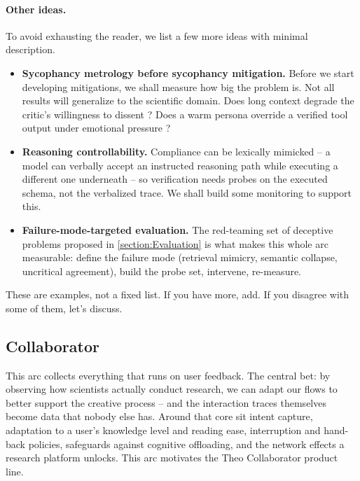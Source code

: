 \paragraph{Other ideas.}
To avoid exhausting the reader, we list a few more ideas with minimal description.
\begin{itemize}
    \item \textbf{Sycophancy metrology before sycophancy mitigation.} Before we start developing mitigations, we shall measure how big the problem is. Not all results will generalize to the scientific domain. Does long context degrade the critic's willingness to dissent \cite{Jain2026}? Does a warm persona override a verified tool output under emotional pressure \cite{Ibrahim2026}?
    \item \textbf{Reasoning controllability.} Compliance can be lexically mimicked -- a model can verbally accept an instructed reasoning path while executing a different one underneath \cite{2604.27251} -- so verification needs probes on the executed schema, not the verbalized trace. We shall build some monitoring to support this.
    \item \textbf{Failure-mode-targeted evaluation.} The red-teaming set of deceptive problems proposed in \ref{section:Evaluation} is what makes this whole arc measurable: define the failure mode (retrieval mimicry, semantic collapse, uncritical agreement), build the probe set, intervene, re-measure.
\end{itemize}

These are examples, not a fixed list. If you have more, add. If you disagree with some of them, let's discuss.


\subsection{Collaborator}
\label{arc:human_aspect}

\begin{summarybox}
    This arc collects everything that runs on user feedback. The central bet: by observing how scientists actually conduct research, we can adapt our flows to better support the creative process -- and the interaction traces themselves become data that nobody else has. Around that core sit intent capture, adaptation to a user's knowledge level and reading ease, interruption and hand-back policies, safeguards against cognitive offloading, and the network effects a research platform unlocks. This arc motivates the Theo Collaborator product line.
\end{summarybox}

